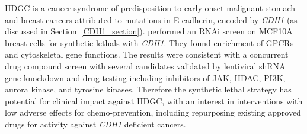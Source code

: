 
\Gls{HDGC} is a cancer syndrome of predisposition to early-onset malignant stomach and breast cancers attributed to \glspl{mutation} in \gls{E-cadherin}, encoded by \textit{CDH1} (as discussed in Section~\ref{CDH1_section}). \citet{Telford2015} performed an \gls{RNAi} screen on MCF10A breast cells for \glspl{synthetic lethal} with \textit{CDH1}. They found enrichment of \glspl{GPCR} and cytoskeletal gene functions. The results were consistent with a concurrent drug compound screen with several candidates validated by lentiviral \gls{shRNA} gene knockdown and drug testing including inhibitors of \gls{JAK}, \gls{HDAC}, \gls{PI3K}, aurora kinase, and tyrosine kinases. Therefore the \gls{synthetic lethal} strategy has potential for clinical impact against \gls{HDGC}, with an interest in interventions with low adverse effects for chemo-prevention, including repurposing existing approved drugs for activity against \textit{CDH1} deficient cancers.  


